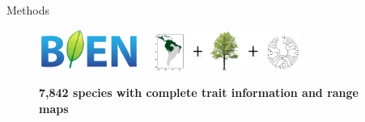 \documentclass[final]{beamer}
\newlength{\onecolwid}
\begin{document}
\begin{frame}[t]
\begin{columns}[t]
\begin{column}{\onecolwid}
\begin{block}{Methods}
%
%
%
%
%
%
%
%
%
%

\begin{figure}[h]
	\centering
	\includegraphics[width=0.3\textwidth]{./logos/bien_logo_notext-1.png}
	~
	\includegraphics[width=0.42\textwidth]{./figures/Methods_figs.pdf}
	\caption{\footnotesize \textbf{7,842 species with complete trait information and range maps}}
	\label{fig:methods}
\end{figure}



\end{block}
\end{column}
\end{columns}
\end{frame}
\end{document}
